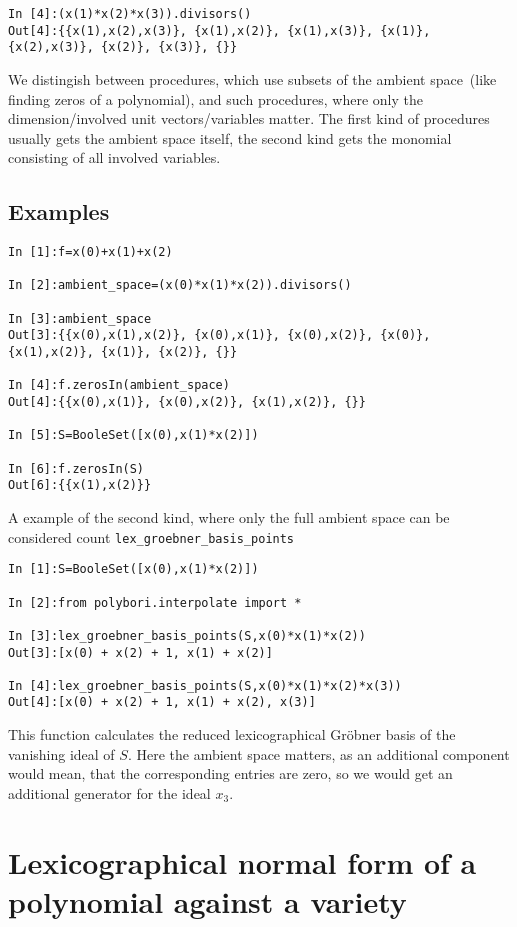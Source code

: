 \documentclass[]{article}
\newcommand{\Groebner}{Gr\"{o}bner\xspace}
\begin{document}
\begin{verbatim}
In [4]:(x(1)*x(2)*x(3)).divisors()
Out[4]:{{x(1),x(2),x(3)}, {x(1),x(2)}, {x(1),x(3)}, {x(1)}, {x(2),x(3)}, {x(2)}, {x(3)}, {}}
\end{verbatim}

We distingish between procedures, which use subsets of the ambient space~(like
finding zeros of a polynomial),  and such procedures, where
only the dimension/involved unit vectors/variables matter.
The first kind of procedures usually gets the ambient space itself, the second kind gets the monomial consisting of all involved variables.

\subsection{Examples}
\begin{verbatim}
In [1]:f=x(0)+x(1)+x(2)

In [2]:ambient_space=(x(0)*x(1)*x(2)).divisors()

In [3]:ambient_space
Out[3]:{{x(0),x(1),x(2)}, {x(0),x(1)}, {x(0),x(2)}, {x(0)}, {x(1),x(2)}, {x(1)}, {x(2)}, {}}

In [4]:f.zerosIn(ambient_space)
Out[4]:{{x(0),x(1)}, {x(0),x(2)}, {x(1),x(2)}, {}}

In [5]:S=BooleSet([x(0),x(1)*x(2)])

In [6]:f.zerosIn(S)
Out[6]:{{x(1),x(2)}}
\end{verbatim}

A example of the second kind, where only the full ambient space can be considered count \verb|lex_groebner_basis_points|
\begin{verbatim}
In [1]:S=BooleSet([x(0),x(1)*x(2)])

In [2]:from polybori.interpolate import *              

In [3]:lex_groebner_basis_points(S,x(0)*x(1)*x(2))
Out[3]:[x(0) + x(2) + 1, x(1) + x(2)]

In [4]:lex_groebner_basis_points(S,x(0)*x(1)*x(2)*x(3))
Out[4]:[x(0) + x(2) + 1, x(1) + x(2), x(3)]
\end{verbatim}

This function calculates the reduced lexicographical \Groebner basis of the vanishing ideal of $S$.
Here the ambient space matters, as an additional component would mean, that the corresponding entries are zero, so we would get an additional generator for the ideal $x_3$.

\section{Lexicographical normal form of a polynomial against a variety}
\end{document}
